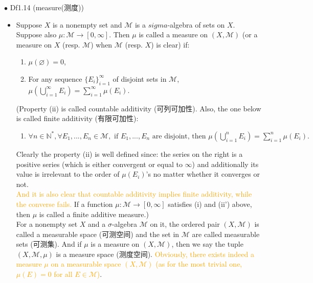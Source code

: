 \documentclass{article}
\begin{document}
{\Large $\bullet $ Df1.14 (measure(测度))}\par
\begin{itemize}
    \item[]
    {\large Suppose $X$ is a nonempty set and $\mathcal{M}$ is a $sigma$-algebra of sets on $X$. Suppose also
    $\mu:\mathcal{M}\rightarrow [0,\infty]$. Then $\mu$ is called a measure on $(X, \mathcal{M})$ 
    (or a measure on $X$ (resp. $\mathcal{M}$) when $\mathcal{M}$ (resp. $X$) is clear) if:
    \begin{enumerate}
        \item[(i)] $\mu(\varnothing)=0$,
        \item[(ii)] For any sequence $\{E_i\}_{i=1}^\infty$ of disjoint sets in $\mathcal{M}$,
                    $\mu(\bigcup_{i=1}^\infty E_i) = \sum_{i=1}^\infty \mu(E_i)$.
    \end{enumerate}
    (Property (ii) is called countable additivity (可列可加性). Also, the one below is called finite additivity
    (有限可加性):
    \begin{enumerate}
        \item[(ii')] $\forall n\in \mathbb{N}^\ast, \forall E_1,...,E_n\in \mathcal{M}, \text{ if } E_1,...,E_n
        \text{ are disjoint, then } \mu(\bigcup_{i=1}^n E_i) = \sum_{i=1}^n \mu(E_i).$
    \end{enumerate}
    {Clearly the property (ii) is well defined since: the series on the right is a positive series (which is 
    either convergent or equal to $\infty$) and additionally its value is irrelevant to the order of $\mu(E_i)$'s
    no matter whether it converges or not.}\\
    \textcolor{orange}{And it is also clear that countable additivity implies finite additivity, while the converse fails.}
    If a function $\mu:\mathcal{M}\rightarrow [0,\infty]$ satisfies (i) and (ii') above, then $\mu$ is called a
    finite additive measure.)\\
    For a nonempty set $X$ and a $\sigma$-algebra $\mathcal{M}$ on it, the ordered pair 
    $(X, \mathcal{M})$ is called a measurable space (可测空间) and the set in $\mathcal{M}$ are called 
    measurable sets (可测集). And if $\mu$ is a measure on $(X, \mathcal{M})$, then we say the tuple 
    $(X, \mathcal{M}, \mu)$ is a measure space (测度空间). \textcolor{orange}{Obviously, there exists indeed a
    measure $\mu$ on a measurable space $(X, \mathcal{M})$ (as for the most trivial one, 
    $\mu(E)=0$ for all $E\in \mathcal{M}$)}.
    }
\end{itemize}\par
\quad
\end{document}
